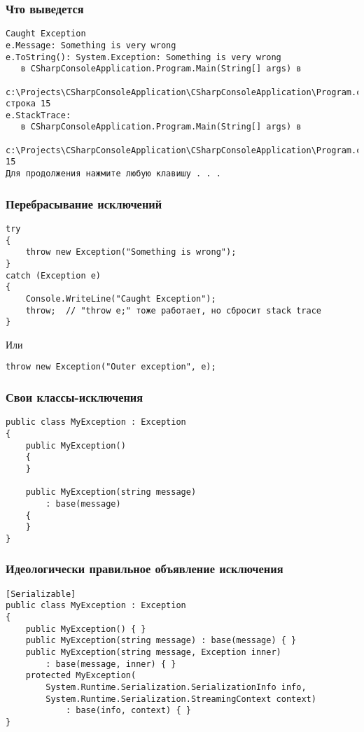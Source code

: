 \documentclass[xetex,mathserif,serif]{beamer}
\begin{document}
    \begin{frame}[fragile]
        \frametitle{Что выведется}
        \begin{scriptsize}
            \begin{verbatim}
Caught Exception
e.Message: Something is very wrong
e.ToString(): System.Exception: Something is very wrong
   в CSharpConsoleApplication.Program.Main(String[] args) в 
       c:\Projects\CSharpConsoleApplication\CSharpConsoleApplication\Program.cs: строка 15
e.StackTrace:
   в CSharpConsoleApplication.Program.Main(String[] args) в 
       c:\Projects\CSharpConsoleApplication\CSharpConsoleApplication\Program.cs:строка 15
Для продолжения нажмите любую клавишу . . .
            \end{verbatim}
        \end{scriptsize}
    \end{frame}

    \begin{frame}[fragile]
        \frametitle{Перебрасывание исключений}
        \begin{verbatim}
try
{
    throw new Exception("Something is wrong");
}
catch (Exception e)
{
    Console.WriteLine("Caught Exception");
    throw;  // "throw e;" тоже работает, но сбросит stack trace
}
        \end{verbatim}

        Или
        \begin{verbatim}
throw new Exception("Outer exception", e);
        \end{verbatim}
    \end{frame}

    \begin{frame}[fragile]
        \frametitle{Свои классы-исключения}
        \begin{verbatim}
public class MyException : Exception
{
    public MyException() 
    {
    }

    public MyException(string message)
        : base(message)
    {
    }
}
        \end{verbatim}
    \end{frame}

    \begin{frame}[fragile]
        \frametitle{Идеологически правильное объявление исключения}
        \begin{verbatim}
[Serializable]
public class MyException : Exception
{
    public MyException() { }
    public MyException(string message) : base(message) { }
    public MyException(string message, Exception inner) 
        : base(message, inner) { }
    protected MyException(
        System.Runtime.Serialization.SerializationInfo info,
        System.Runtime.Serialization.StreamingContext context)
            : base(info, context) { }
}
        \end{verbatim}
    \end{frame}
\end{document}
